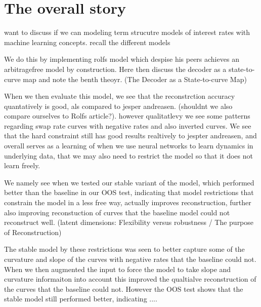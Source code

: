 


\newpage
\section{The overall story}

want to discuss if we can modeling term strucutre models of interest rates with machine learning concepts. recall the different models 

We do this by implementing rolfs model which despise his peers achieves an arbitragefree model by construction. Here then discuss the decoder as a state-to-curve map and note the benth theoyr. (The Decoder as a State-to-curve Map)


When we then evaluate this model, we see that the reconstrction accuracy quantatively is good, als compared to jesper andreasen. (shouldnt we also compare ourselves to Rolfs article?). however qualitatlevy we see some patterns regarding swap rate curves with negative rates and also inverted curves.  
We see that the hard constraint still has good results realtively to jespter andreasen, and overall serves as a learning of when we use neural networks to learn dynamics in underlying data, that we may also need to restrict the model so that it does not learn freely. 

We namely see when we tested our stable variant of the model, which performed better than the baseline in our OOS test, indicating that model restrictions that constrain the model in a less free way, actually improves reconstruction, further also improving reconstuction of curves that the baseline model could not reconstruct well. (latent dimensions: Flexibility versus robustness / The purpose of Reconstruction)

The stable model by these restrictions was seen to better capture some of the curvature and slope of the curves with negative rates that the baseline could not. 
When we then augmented the input to force the model to take slope and curvature informaiton into account this improved the qualtialve reconstruction of the curves that the baseline could not. However the OOS test shows that the stable model still performed better, indicating ....

